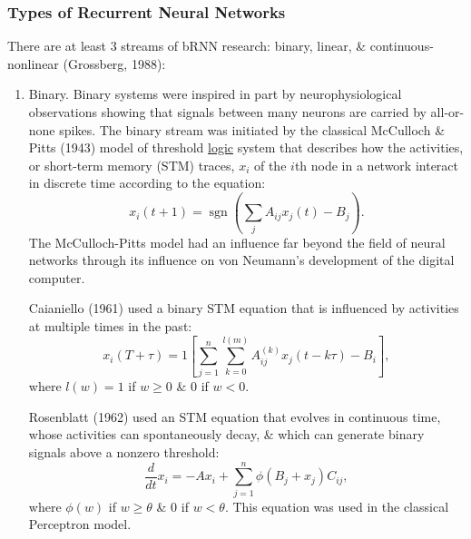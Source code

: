 \documentclass{article}
\begin{document}
\subsubsection{Types of Recurrent Neural Networks}
There are at least 3 streams of bRNN research: binary, linear, \& continuous-nonlinear (Grossberg, 1988):
\begin{enumerate}
	\item {\sf Binary.} Binary systems were inspired in part by neurophysiological observations showing that signals between many neurons are carried by all-or-none spikes. The binary stream was initiated by the classical {\sc McCulloch \& Pitts} (1943) model of threshold \href{http://www.scholarpedia.org/article/Logic}{logic} system that describes how the activities, or short-term memory (STM) traces, $x_i$ of the $i$th node in a network interact in discrete time according to the equation:
	\begin{equation*}
		x_i(t + 1) = \operatorname{sgn}\left(\sum_j A_{ij}x_j(t) - B_j\right).
	\end{equation*}
	The McCulloch-Pitts model had an influence far beyond the field of neural networks through its influence on {\sc von Neumann}'s development of the digital computer.
	
	Caianiello (1961) used a binary STM equation that is influenced by activities at multiple times in the past:
	\begin{equation*}
		x_i(T + \tau) = 1\left[\sum_{j=1}^n\sum_{k=0}^{l(m)} A_{ij}^{(k)}x_j(t - k\tau) - B_i\right],
	\end{equation*}
	where $l(w) = 1$ if $w\ge0$ \& 0 if $w < 0$.
	
	Rosenblatt (1962) used an STM equation that evolves in continuous time, whose activities can spontaneously  decay, \& which can generate binary signals above a nonzero threshold:
	\begin{equation*}
		\frac{d}{dt}x_i = -Ax_i + \sum_{j=1}^n \phi(B_j + x_j)C_{ij},
	\end{equation*}
	where $\phi(w)$ if $w\ge\theta$ \& 0 if $w < \theta$. This equation was used in the classical Perceptron model.
	

\end{enumerate}
\end{document}
